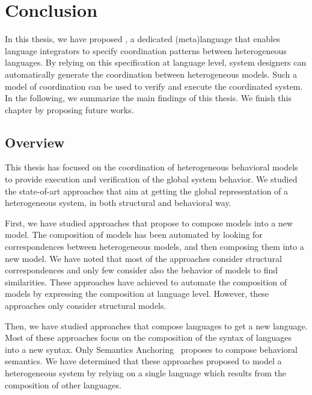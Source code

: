 \chapter{Conclusion}
\label{ch:conclusions}
In this thesis, we have proposed \bcool, a dedicated (meta)language that enables language integrators to specify coordination patterns between heterogeneous languages. By relying on this specification at language level, system designers can automatically generate the coordination between heterogeneous models. Such a model of coordination can be used to verify and execute the coordinated system. In the following, we summarize the main findings of this thesis. We finish this chapter by proposing future works. 

\section{Overview}
	
This thesis has focused on the coordination of heterogeneous behavioral models to provide execution and verification of the global system behavior. We studied the state-of-art approaches that aim at getting the global representation of a heterogeneous system, in both structural and behavioral way. 

First, we have studied approaches that propose to compose models into a new model. The composition of models has been automated by looking for correspondences between heterogeneous models, and then composing them into a new model. We have noted that most of the approaches consider structural correspondences and only few consider also the behavior of models to find similarities. These approaches have achieved to automate the composition of models by expressing the composition at language level. However, these approaches only consider structural models.  

Then, we have studied approaches that compose languages to get a new language. Most of these approaches focus on the composition of the syntax of languages into a new syntax. Only Semantics Anchoring~\cite{semanticsanchoring} proposes to compose behavioral semantics. We have determined that these approaches proposed to model a heterogeneous system by relying on a single language which results from the composition of other languages.

